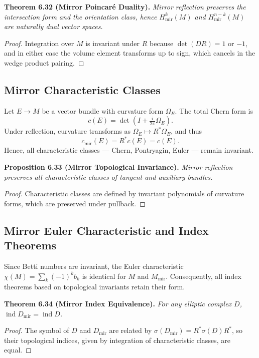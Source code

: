 \noindent
\textbf{Theorem 6.32 (Mirror Poincaré Duality).}
\emph{Mirror reflection preserves the intersection form and the orientation class,
hence \(H_{\mathrm{mir}}^{k}(M)\) and \(H_{\mathrm{mir}}^{n-k}(M)\)
are naturally dual vector spaces.}

\begin{proof}
Integration over \(M\) is invariant under \(R\)
because \(\det(DR)=1\) or \(-1\),
and in either case the volume element transforms up to sign,
which cancels in the wedge product pairing.
\end{proof}

\subsection{Mirror Characteristic Classes}\relax \hspace{0pt}

Let \(E\to M\) be a vector bundle with curvature form \(\Omega_E\).
The total Chern form is
\[
c(E)=\det\left(I+\tfrac{i}{2\pi}\Omega_E\right).
\]
Under reflection, curvature transforms as
\(\Omega_E\mapsto R^{*}\Omega_E\),
and thus
\[
c_{\mathrm{mir}}(E)
=R^{*}c(E)=c(E).
\]
Hence, all characteristic classes — Chern, Pontryagin, Euler —
remain invariant.

\noindent
\textbf{Proposition 6.33 (Mirror Topological Invariance).}
\emph{Mirror reflection preserves all characteristic classes of tangent and auxiliary bundles.}

\begin{proof}
Characteristic classes are defined by invariant polynomials
of curvature forms, which are preserved under pullback.
\end{proof}

\subsection{Mirror Euler Characteristic and Index Theorems}\relax \hspace{0pt}

Since Betti numbers are invariant,
the Euler characteristic
\(\chi(M)=\sum_{k}(-1)^{k}b_{k}\)
is identical for \(M\) and \(M_{\mathrm{mir}}\).
Consequently, all index theorems based on topological invariants
retain their form.

\noindent
\textbf{Theorem 6.34 (Mirror Index Equivalence).}
\emph{For any elliptic complex \(D\),
\(\operatorname{ind}D_{\mathrm{mir}}=\operatorname{ind}D\).}

\begin{proof}
The symbol of \(D\) and \(D_{\mathrm{mir}}\) are related by
\(\sigma(D_{\mathrm{mir}})=R^{*}\sigma(D)R^{*}\),
so their topological indices, given by integration of characteristic classes,
are equal.
\end{proof}

